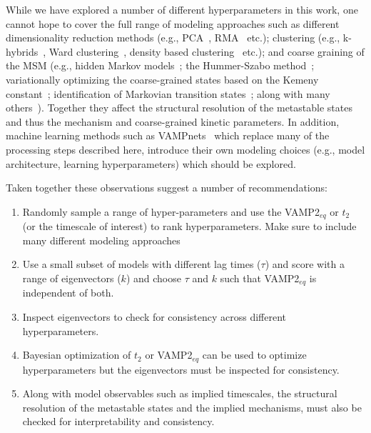 \documentclass[journal=jacsat,manuscript=article]{achemso}
\begin{document}
While we have explored a number of different hyperparameters in this work, one cannot hope to cover the full range of modeling approaches such as different dimensionality reduction methods (e.g., PCA~\cite{nagelSelectingFeaturesMarkov2023}, RMA~\cite{mitsutakeRelaxationModeAnalysis2018} etc.); clustering (e.g., k-hybrids~\cite{porterEnsparaModelingMolecular2019}, Ward clustering~\cite{Ward_Clust2017}, density based clustering~\cite{nagelSelectingFeaturesMarkov2023} etc.); and coarse graining of the MSM (e.g., hidden Markov models~\cite{noeProjectedHiddenMarkov2013a}; the Hummer-Szabo method~\cite{hummerOptimalDimensionalityReduction2015}; variationally optimizing the coarse-grained states based on the Kemeny constant~\cite{koskinVariationalKineticClustering2023}; identification of Markovian transition states~\cite{martiniVariationalIdentificationMarkovian2017}; along with many others~\cite{orioliDimensionalReductionMarkov2016, jainIdentifyingMetastableStates2012, bowmanImprovedCoarsegrainingMarkov2012}). Together they affect the structural resolution of the metastable states and thus the mechanism and coarse-grained kinetic parameters. In addition, machine learning methods such as VAMPnets~\cite{VAMPnets_f2018} which replace many of the processing steps described here, introduce their own modeling choices (e.g., model architecture, learning hyperparameters) which should be explored.  

Taken together these observations suggest a number of recommendations: 

\begin{enumerate}
    \item Randomly sample a range of hyper-parameters and use the VAMP2$_{eq}$ or $t_2$ (or the timescale of interest) to rank hyperparameters. Make sure to include many different modeling approaches
    \item Use a small subset of models with different lag times ($\tau$) and score with a range of eigenvectors ($k$) and choose $\tau$ and $k$ such that VAMP2$_{eq}$ is independent of both.  
    \item Inspect eigenvectors to check for consistency across different hyperparameters. 
    \item Bayesian optimization of $t_2$ or VAMP2$_{eq}$ can be used to optimize hyperparameters but the eigenvectors must be inspected for consistency.  
    \item Along with model observables such as implied timescales, the structural resolution of the metastable states and the implied mechanisms, must also be checked for interpretability and consistency. 
\end{enumerate}
\end{document}
